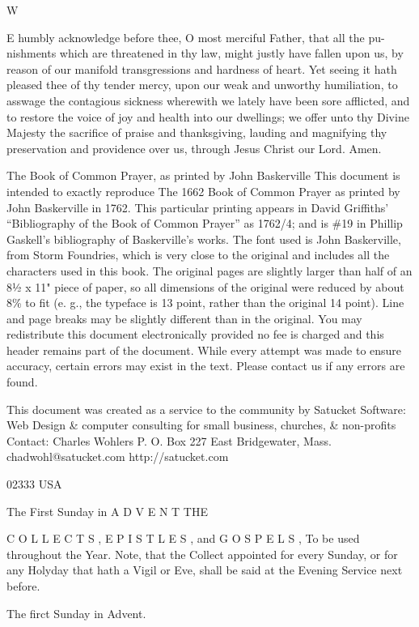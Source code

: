 W

E humbly acknowledge before thee, O most merciful Father, that all the pu-nishments which are threatened in thy law, might justly have fallen upon us, by reason of our manifold transgressions and hardness of heart. Yet seeing it hath pleased thee of thy tender mercy, upon our weak and unworthy humiliation, to asswage the contagious sickness wherewith we lately have been sore afflicted, and to restore the voice of joy and health into our dwellings; we offer unto thy Divine Majesty the sacrifice of praise and thanksgiving, lauding and magnifying thy preservation and providence over us, through Jesus Christ our Lord. Amen.


The Book of Common Prayer, as printed by John Baskerville This document is intended to exactly reproduce The 1662 Book of Common Prayer as printed by John Baskerville in 1762. This particular printing appears in David Griffiths' “Bibliography of the Book of Common Prayer” as 1762/4; and is \#19 in Phillip Gaskell's bibliography of Baskerville's works. The font used is John Baskerville, from Storm Foundries, which is very close to the original and includes all the characters used in this book. The original pages are slightly larger than half of an 8½ x 11" piece of paper, so all dimensions of the original were reduced by about 8\% to fit (e. g., the typeface is 13 point, rather than the original 14 point). Line and page breaks may be slightly different than in the original. You may redistribute this document electronically provided no fee is charged and this header remains part of the document. While every attempt was made to ensure accuracy, certain errors may exist in the text. Please contact us if any errors are found.

This document was created as a service to the community by Satucket Software: Web Design \& computer consulting for small business, churches, \& non-profits Contact: Charles Wohlers P. O. Box 227 East Bridgewater, Mass. chadwohl@satucket.com http://satucket.com

02333 USA

The First Sunday in A D V E N T THE

C O L L E C T S , E P I S T L E S , and G O S P E L S , To be used throughout the Year. Note, that the Collect appointed for every Sunday, or for any Holyday that hath a Vigil or Eve, shall be said at the Evening Service next before.

The firct Sunday in Advent.

